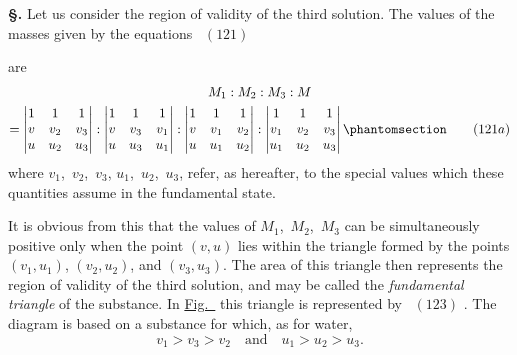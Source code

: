 \documentclass[12pt]{book}[2005/09/16]
\newcommand{\Chg}[2]{#2}
\newcommand{\Add}[1]{\Chg{}{#1}}
\newcommand{\Section}[1]{
  \medskip\par\textbf{§\;#1}
  \label{section:#1}
}
\newcommand{\Tag}[1]{%
  \phantomsection\label{eqn:#1}\tag*{\ensuremath{#1}}%
}
\newcommand{\Eq}[1]{%
  \hyperref[eqn:#1]{\ensuremath{#1}}%
}
\newcommand{\Fig}[1]{\hyperref[fig:#1]{Fig.~{\upshape #1}}}
\newcommand{\PageSep}[1]{\ignorespaces}
\begin{document}
\Section{190.} Let us consider the region of validity of the third
\PageSep{159}
solution. The values of the masses given by the equations~\Eq{(121)}
are
\begin{multline*}
M_{1} : M_{2} : M_{3} : M \\
  = \left|\begin{array}{@{}ccc@{}}
  1 & 1 & 1 \\
  v & v_{2} & v_{3} \\
  u & u_{2} & u_{3} \\
  \end{array}\right|
: \left|\begin{array}{@{}ccc@{}}
  1 & 1 & 1 \\
  v & v_{3} & v_{1} \\
  u & u_{3} & u_{1} \\
  \end{array}\right|
: \left|\begin{array}{@{}ccc@{}}
  1 & 1 & 1 \\
  v & v_{1} & v_{2} \\
  u & u_{1} & u_{2} \\
  \end{array}\right|
: \left|\begin{array}{@{}ccc@{}}
  1 & 1 & 1 \\
  v_{1} & v_{2} & v_{3} \\
  u_{1} & u_{2} & u_{3} \\
  \end{array}\right|
\Tag{(121a)}
\end{multline*}
where $v_{1}$,~$v_{2}$,~$v_{3}$, $u_{1}$,~$u_{2}$,~$u_{3}$, refer, as hereafter, to the special
values which these quantities assume in the fundamental
state.

It is obvious from this that the values of $M_{1}$,~$M_{2}$,~$M_{3}$ can
be simultaneously positive only when the point $(v, u)$ lies
within the triangle formed by the points $(v_{1}, u_{1})$\Add{,} $(v_{2}, u_{2})$\Add{,} and
$(v_{3}, u_{3})$. The area of this triangle then represents the
region of validity of the third solution, and may be called
the \emph{fundamental triangle} of the substance. In \Fig{4} this
%
%
triangle is represented by~\Eq{(123)}. The diagram is based on
a substance for which, as for water,
\[
v_{1} > v_{3} > v_{2}\quad\text{and}\quad u_{1} > u_{2} > u_{3}.
\]
\end{document}
